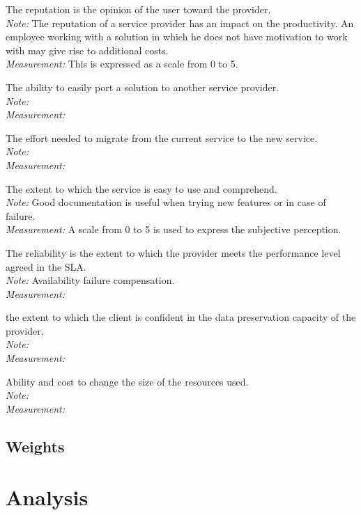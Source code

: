 \documentclass[a4paper,11pt]{article}
\begin{document}
\begin{description}[parsep=1pt,listparindent=\parindent,labelindent=\parindent,font=$\bullet$\ ]
  \item[Reputation:] The reputation is the opinion of the user toward the provider.\\
    \emph{Note:} The reputation of a service provider has an impact on the productivity. An employee working with a solution in which he does not have motivation to work with may give rise to additional costs.\\
    \emph{Measurement:} This is expressed as a scale from 0 to 5.
    
  \item[Portability:] The ability to easily port a solution to another service provider.\\%
    \emph{Note:} \\
    \emph{Measurement:} 

  \item[Migration:] The effort needed to migrate from the current service to the new service.\\
    \emph{Note:} \\
    \emph{Measurement:} 

  \item[Usability:] The extent to which the service is easy to use and comprehend.\\
    \emph{Note:} Good documentation is useful when trying new features or in case of failure.\\
    \emph{Measurement:} A scale from 0 to 5 is used to express the subjective perception.

  \item[Reliability:] The reliability is the extent to which the provider meets the performance level agreed in the SLA.\\
    \emph{Note:} Availability failure compensation.\\
    \emph{Measurement:} 

  \item[Security backup:] the extent to which the client is confident in the data preservation capacity of the provider.\\
    \emph{Note:} \\
    \emph{Measurement:} 

  \item[Scalability:] Ability and cost to change the size of the resources used.\\
    \emph{Note:} \\
    \emph{Measurement:} 

\end{description}


\subsection{Weights}


\section{Analysis}
\end{document}
